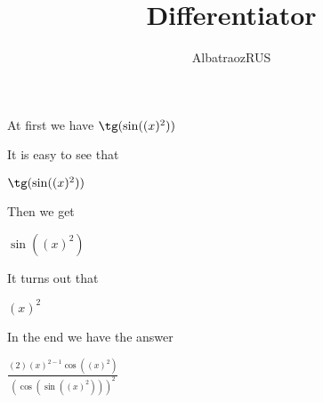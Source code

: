 \documentclass{article}
\title{Differentiator}
\author{AlbatraozRUS}
\begin{document}
\maketitle

\newpage
At first we have
$\tg(\sin((x)^{2}))$

It is easy to see that

$\tg(\sin((x)^{2}))$

Then we get

$\sin((x)^{2})$

It turns out that

$(x)^{2}$

In the end we have the answer

$\frac{(2)(x)^{2-1}\cos((x)^{2})}{(\cos(\sin((x)^{2})))^{2}}$
\end{document}
